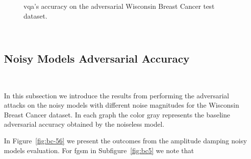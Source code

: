 \begin{figure}[!h]
  \caption{\ac{vqa}'s accuracy on the adversarial Wisconsin Breast Cancer test dataset.}
  \label{fig:bc-34}
\end{figure} \

\subsection{Noisy Models Adversarial Accuracy}\label{subsection:breast-cancer-noisy-adv-acc} \

In this subsection we introduce the results from performing
the adversarial attacks on the noisy models with different noise
magnitudes for the Wisconsin Breast Cancer dataset. In each graph
the color gray represents the baseline adversarial accuracy obtained
by the noiseless model. \

In Figure~\ref{fig:bc-56} we present the outcomes from the amplitude
damping noisy models evaluation. For \ac{fgsm} in Subfigure~\ref{fig:bc5}
we note that \

